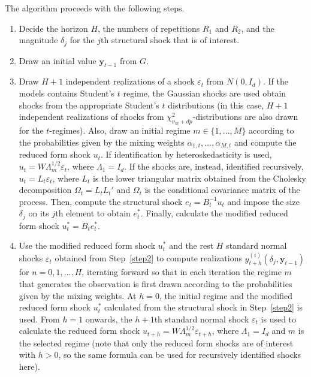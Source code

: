 \documentclass[nojss]{jss}
\begin{document}
\begin{appendix}
The algorithm proceeds with the following steps.
\begin{enumerate}\addtocounter{enumi}{-1}
\item Decide the horizon $H$, the numbers of repetitions $R_1$ and $R_2$, and the magnitude $\delta_j$ for the $j$th structural shock that is of interest.

\item Draw an initial value $\boldsymbol{y}_{t-1}$ from $G$.\label{step1}

\item Draw $H+1$ independent realizations of a shock $\varepsilon_t$ from $N(0,I_d)$. If the models contains Student's $t$ regime, the Gaussian shocks are used obtain shocks from the appropriate Student's $t$ distributions (in this case, $H+1$ independent realizations of shocks from $\chi^2_{\nu_m + dp}$-distributions are also drawn for the $t$-regimes). Also, draw an initial regime $m\in \lbrace 1,...,M \rbrace$ according to the probabilities given by the mixing weights $\alpha_{1,t},...,\alpha_{M,t}$ and compute the reduced form shock $u_t$. If identification by heteroskedasticity is used, $u_t=W\Lambda_m^{1/2}\varepsilon_t$, where $\Lambda_1=I_d$. If the shocks are, instead, identified recursively, $u_t=L_t\varepsilon_t$, where $L_t$ is the lower triangular matrix obtained from the Cholesky decomposition $\Omega_t = L_tL_t'$ and $\Omega_t$ is the conditional covariance matrix of the process. Then, compute the structural shock $e_t = B_t^{-1}u_t$ and impose the size $\delta_j$ on its $j$th element to obtain $e_t^*$. Finally, calculate the modified reduced form shock $u_t^*=B_te_t^*$.\label{step2} %

\item Use the modified reduced form shock $u_t^*$ and the rest $H$ standard normal shocks $\varepsilon_t$ obtained from Step~\ref{step2} to compute realizations $y_{t+h}^{(i)}(\delta_j,\boldsymbol{y}_{t-1})$ for $n=0,1,...,H$, iterating forward so that in each iteration the regime $m$ that generates the observation is first drawn according to the probabilities given by the mixing weights. At $h=0$, the initial regime and the modified reduced form shock $u_t^*$ calculated from the structural shock in Step~\ref{step2} is used. From $h=1$ onwards, the $h+1$th standard normal shock $\varepsilon_t$ is used to calculate the reduced form shock $u_{t+h}=W\Lambda_m^{1/2}\varepsilon_{t+h}$, where $\Lambda_1=I_d$ and $m$ is the selected regime (note that only the reduced form shocks are of interest with $h>0$, so the same formula can be used for recursively identified shocks here).


\end{enumerate}
\end{appendix}
\end{document}
